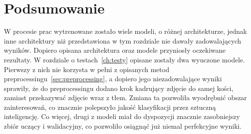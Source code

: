 \section{Podsumowanie}\label{sec:podsumowanie}

W procesie prac wytrenowane zostało wiele modeli, o różnej architekturze, jednak inne architektury niż przedstawiona w tym rozdziale nie dawały zadowalających wyników.
Dopiero opisana architektura oraz modele przyniosły oczekiwane rezultaty.
W rozdziale o testach~\ref{ch:testy} opisane zostały dwa wyuczone modele.
Pierwszy z nich nie korzysta w pełni z opisanych metod preprocessingu~\ref{sec:preprocessing}, a dopiero jego niezadowalające wyniki sprawiły,
że do preprocessingu dodano krok kadrujący zdjęcie do samej kości, zamiast przekazywać zdjęcie wraz z tłem.
Zmiana ta pozwoliła wyodrębnić obszar zainteresowań, co znacznie polepszyło jakość klasyfikacji przez sztuczną inteligencję.
Co więcej, drugi z modeli miał do dyspozycji znacznie zasobniejszy zbiór uczący i walidacyjny, co pozwoliło osiągnąć już niemal perfekcyjne wyniki.

